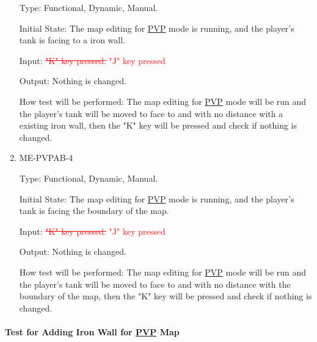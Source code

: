 \documentclass[12pt, titlepage]{article}
\begin{document}
\begin{enumerate}
Type: Functional, Dynamic, Manual.
					
Initial State: The map editing for \underline{PVP} mode is running, and the player's tank is facing to a iron wall.
					
Input: \textcolor{red}{\sout{"K" key pressed.}} \textcolor{red}{"J" key pressed}
					
Output: Nothing is changed.
					
How test will be performed: The map editing for \underline{PVP} mode will be run and the player's tank will be moved to face to and with no distance with a existing iron wall, then the "K" key will be pressed and check if nothing is changed.

\item{ME-PVPAB-4\\}

Type: Functional, Dynamic, Manual.
					
Initial State: The map editing for \underline{PVP} mode is running, and the player's tank is facing the boundary of the map.
					
Input: \textcolor{red}{\sout{"K" key pressed.}} \textcolor{red}{"J" key pressed}
					
Output: Nothing is changed.
					
How test will be performed: The map editing for \underline{PVP} mode will be run and the player's tank will be moved to face to and with no distance with the boundary of the map, then the "K" key will be pressed and check if nothing is changed.

\end{enumerate}

\paragraph{Test for Adding Iron Wall for \underline{PVP} Map}
\end{document}
